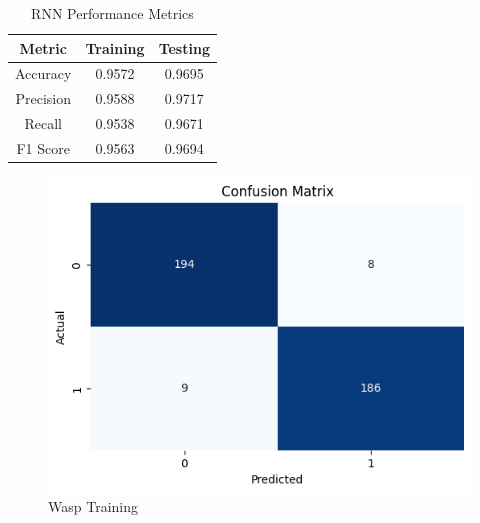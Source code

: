 \documentclass[12pt]{article}
\begin{document}
\begin{enumerate}
		\begin{table}[H]
			\centering
			\caption{RNN Performance Metrics}
			\vspace{0.25 cm}
			\begin{tabular}{|c|c|c|}
				\hline
				\textbf{Metric} & \textbf{Training} & \textbf{Testing} \\
				\hline
				Accuracy & 0.9572  & 0.9695 \\ \hline
				Precision & 0.9588 & 0.9717 \\ \hline
				Recall & 0.9538 & 0.9671 \\ \hline
				F1 Score & 0.9563  & 0.9694 \\ \hline
			\end{tabular}
			\label{tab:RNN_METRICS}
		\end{table}
		\begin{figure}[H]
			\centering
			\begin{minipage}[H]{0.45\textwidth}
				\centering
				\includegraphics[width=\textwidth]{Images/Confusion/RNN train.png}\\ \vspace{0.5 cm}
				Wasp Training
			\end{minipage}
			\hfill
			\begin{minipage}[H]{0.45\textwidth}
				\centering

\end{minipage}
\end{figure}
\end{enumerate}
\end{document}
